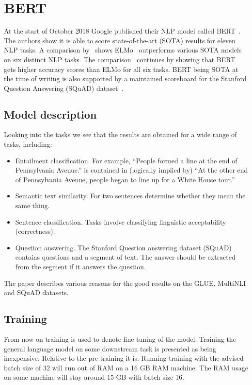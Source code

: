\section{BERT}
\label{sec:bert}
At the start of October 2018 Google published their NLP model called BERT~\citep{devlin2018}.
The authors show it is able to score state-of-the-art (SOTA) results for eleven NLP tasks.
A comparison by~\citet{young2018recent} shows ELMo~\citep{peters2018} outperforms various SOTA models on six distinct NLP tasks.
The comparison~\citep{young2018recent} continues by showing that BERT gets higher accuracy scores than ELMo for all six tasks.
BERT being SOTA at the time of writing is also supported by a maintained scoreboard for the Stanford Question Answering (SQuAD) dataset~\citep{rajpurkar2019explorer}.

\subsection{Model description}
\label{subsec:model_description}
Looking into the tasks we see that the results are obtained for a wide range of tasks, including:
\begin{itemize}
    \item Entailment classification.
    For example, ``People formed a line at the end of Pennsylvania Avenue.''
    is contained in (logically implied by) ``At the other end of Pennsylvania Avenue, people began to line up for a White House tour.''~\cite{williams2018}
    \item Semantic text similarity.
    For two sentences determine whether they mean the same thing.
    \item Sentence classification.
    Tasks involve classifying linguistic acceptability (correctness).
    \item Question answering.
    The Stanford Question answering dataset (SQuAD)~\cite{rajpurkar2018} contains questions and a segment of text.
    The answer should be extracted from the segment if it answers the question.
\end{itemize}

The paper describes various reasons for the good results on the GLUE, MultiNLI and SQuAD datasets.


\subsection{Training}
\label{subsec:training}
From now on training is used to denote fine-tuning of the model.
Training the general language model on some downstream task is presented as being inexpensive.
Relative to the pre-training it is.
Running training with the advised batch size of 32 will run out of RAM on a 16 GB RAM machine.
The RAM usage on some machine will stay around 15 GB with batch size 16.

